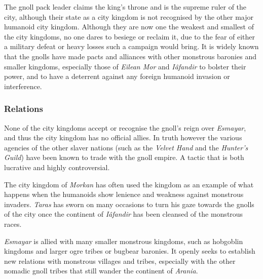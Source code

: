 The gnoll pack leader claims the king's throne and is the supreme ruler of the
city, although their state as a city kingdom is not recognised by the other
major humanoid city kingdom. Although they are now one the weakest and
smallest of the city kingdoms, no one dares to besiege or reclaim it, due to
the fear of either a military defeat or heavy losses such a campaign would
bring. It is widely known that the gnolls have made pacts and alliances with
other monstrous baronies and smaller kingdoms, especially those of
\emph{Eilean Mor} and \emph{Iâfandir} to bolster their power, and to have a
deterrent against any foreign humanoid invasion or interference.

\subsubsection*{Relations}


None of the city kingdoms accept or recognise the gnoll's reign over
\emph{Esmayar}, and thus the city kingdom has no official allies. In truth
however the various agencies of the other slaver nations (such as the
\emph{Velvet Hand} and the \emph{Hunter's Guild}) have been known to trade
with the gnoll empire. A tactic that is both lucrative and highly
controversial.

The city kingdom of \emph{Morkan} has often used the kingdom as an example of
what happens when the humanoids show lenience and weakness against monstrous
invaders. \emph{Taras} has sworn on many occasions to turn his gaze towards
the gnolls of the city once the continent of \emph{Iâfandir} has been cleansed
of the monstrous races.

\emph{Esmayar} is allied with many smaller monstrous kingdoms, such as
hobgoblin kingdoms and larger ogre tribes or bugbear baronies. It openly seeks
to establish new relations with monstrous villages and tribes, especially with
the other nomadic gnoll tribes that still wander the continent of
\emph{Arania}.
